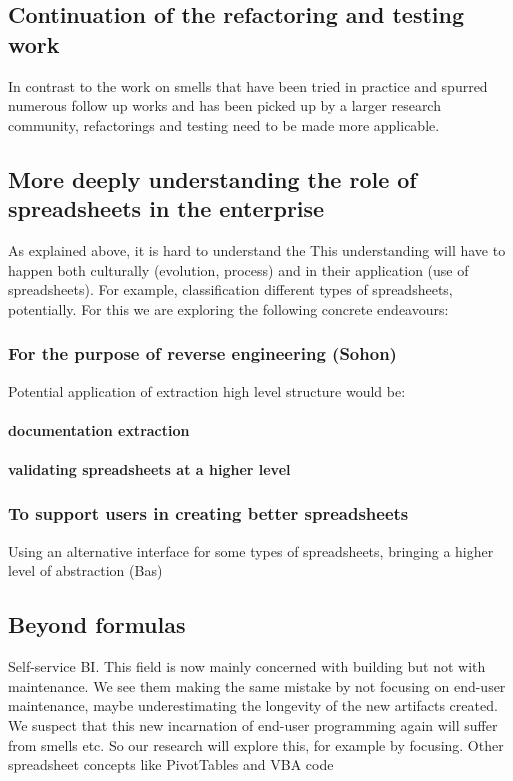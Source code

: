 \documentclass[conference]{IEEEtran}
\begin{document}
\subsection{Continuation of the refactoring and testing work}
In contrast to the work on smells that have been tried in practice and spurred numerous follow up works and has been picked up by a larger research community, refactorings and testing need to be made more applicable.

\subsection{More deeply understanding the role of spreadsheets in the enterprise}
As explained above, it is hard to understand the 
This understanding will have to happen both culturally (evolution, process) and in their application (use of spreadsheets). For example, classification different types of spreadsheets, potentially. For this we are exploring the following concrete endeavours:

\subsubsection{For the purpose of reverse engineering (Sohon)}
Potential application of extraction high level structure would be:
\paragraph{documentation extraction}
\paragraph{validating spreadsheets at a higher level}

\subsubsection{To support users in creating better spreadsheets}
Using an alternative interface for some types of spreadsheets, bringing a higher level of abstraction (Bas)

\subsection{Beyond formulas}

  Self-service BI. This field is now mainly concerned with building but not with maintenance. We see them making the same mistake by not focusing on end-user maintenance, maybe underestimating the longevity of the new artifacts created. We suspect that this new incarnation of end-user programming again will suffer from smells etc. So our research will explore this, for example by focusing. Other spreadsheet concepts like PivotTables and VBA code
  
\end{document}
